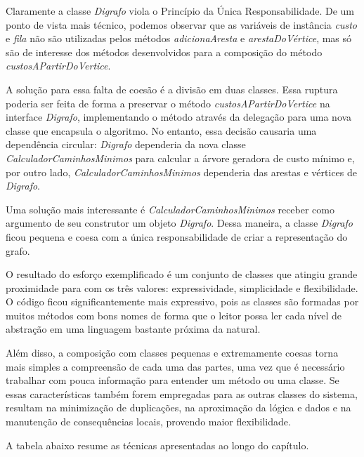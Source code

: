 Claramente a classe \textit{Digrafo} viola o Princípio da Única Responsabilidade. De um ponto de vista mais técnico, 
podemos observar que as variáveis de instância \textit{custo} e \textit{fila} não são utilizadas pelos métodos 
\textit{adicionaAresta} e \textit{arestaDoVértice}, mas só são de interesse dos métodos desenvolvidos para a composição 
do método \textit{custosAPartirDoVertice}.

A solução para essa falta de coesão é a divisão em duas classes. Essa ruptura poderia ser feita de forma a preservar o 
método \textit{custosAPartirDoVertice} na interface \textit{Digrafo}, implementando o método através da delegação para 
uma nova classe que encapsula o algoritmo. No entanto, essa decisão causaria uma dependência circular: \textit{Digrafo} 
dependeria da nova classe \textit{CalculadorCaminhosMinimos} para calcular a árvore geradora de custo mínimo e, por outro lado,
\textit{CalculadorCaminhosMinimos} dependeria das arestas e vértices de \textit{Digrafo}.

Uma solução mais interessante é \textit{CalculadorCaminhosMinimos} receber como argumento de seu construtor um objeto \textit{Digrafo}. Dessa maneira, a classe \textit{Digrafo} ficou pequena e coesa com a única responsabilidade de criar a representação do grafo.


 
O resultado do esforço exemplificado é um conjunto de classes que atingiu grande proximidade para com os três valores: 
expressividade, simplicidade e flexibilidade.
O código ficou significantemente mais expressivo, pois as classes são formadas por muitos métodos com bons nomes de forma que o leitor possa ler cada nível de abstração em uma linguagem bastante próxima da natural.
 
Além disso, a composição com classes pequenas e extremamente coesas torna mais simples a compreensão de cada uma das partes, uma vez que é necessário trabalhar com pouca informação para entender um método ou uma classe. Se essas características também forem empregadas para as outras classes do sistema, resultam na minimização de duplicações, na aproximação da lógica e dados e na manutenção de consequências locais, provendo maior flexibilidade.

A tabela abaixo resume as técnicas apresentadas ao longo do capítulo.

\newenvironment{my_itemize}
{\begin{list}{\labelitemi}
{  \setlength{\itemsep}{0pt}
  \setlength{\parskip}{0pt}
  \setlength{\parsep}{0pt}
  \setlength{\topsep}{0pt}
  \setlength{\partopsep}{0pt}
  \setlength{\leftmargin}{1em}
  \setlength{\rightmargin}{0.5em}
  \setlength{\topmargin}{0.5em}
}
}
{\end{list}}    
     

